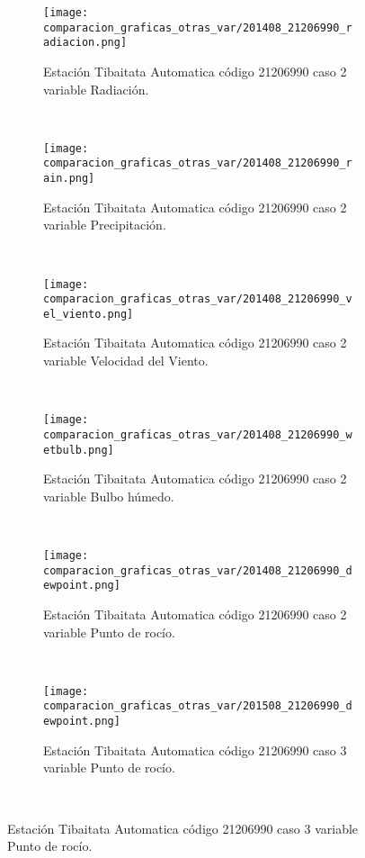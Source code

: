 \begin{figure}[H]
\centering
\begin{subfigure}[normla]{0.4\textwidth}
\caption{Estación Tibaitata Automatica código 21206990 caso 2 variable Radiación.}
\texttt{[image: comparacion\_graficas\_otras\_var/201408\_21206990\_radiacion.png]}
\end{subfigure}
~
\begin{subfigure}[normla]{0.4\textwidth}
\caption{Estación Tibaitata Automatica código 21206990 caso 2 variable Precipitación.}
\texttt{[image: comparacion\_graficas\_otras\_var/201408\_21206990\_rain.png]}
\end{subfigure}
~
\begin{subfigure}[normla]{0.4\textwidth}
\caption{Estación Tibaitata Automatica código 21206990 caso 2 variable Velocidad del Viento.}
\texttt{[image: comparacion\_graficas\_otras\_var/201408\_21206990\_vel\_viento.png]}
\end{subfigure}
~
\begin{subfigure}[normla]{0.4\textwidth}
\caption{Estación Tibaitata Automatica código 21206990 caso 2 variable Bulbo húmedo.}
\texttt{[image: comparacion\_graficas\_otras\_var/201408\_21206990\_wetbulb.png]}
\end{subfigure}
~
\begin{subfigure}[normla]{0.4\textwidth}
\caption{Estación Tibaitata Automatica código 21206990 caso 2 variable Punto de rocío.}
\texttt{[image: comparacion\_graficas\_otras\_var/201408\_21206990\_dewpoint.png]}
\end{subfigure}
~
\begin{subfigure}[normla]{0.4\textwidth}
\caption{Estación Tibaitata Automatica código 21206990 caso 3 variable Punto de rocío.}
\texttt{[image: comparacion\_graficas\_otras\_var/201508\_21206990\_dewpoint.png]}
\end{subfigure}
~
\end{figure}
           
